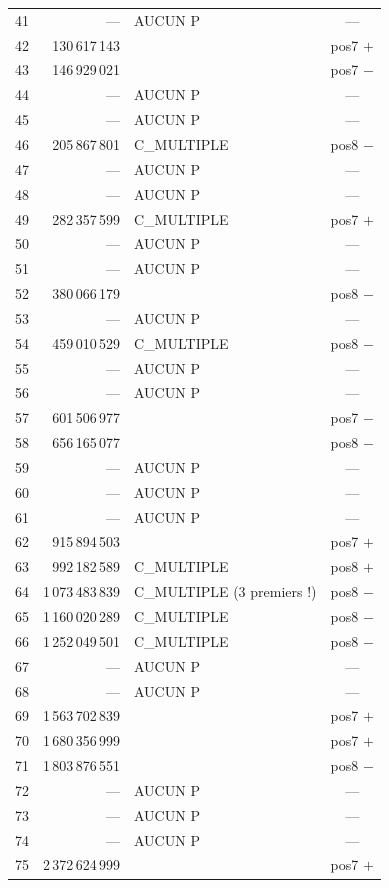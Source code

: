 \documentclass[11pt,a4paper]{article}
\begin{document}
{\begin{longtable}{@{}c r l c@{}}
41 & --- & AUCUN P & --- \\
42 & 130\,617\,143 & & pos7 $+$ \\
43 & 146\,929\,021 & & pos7 $-$ \\
44 & --- & AUCUN P & --- \\
45 & --- & AUCUN P & --- \\
46 & 205\,867\,801 & C\_MULTIPLE & pos8 $-$ \\
47 & --- & AUCUN P & --- \\
48 & --- & AUCUN P & --- \\
49 & 282\,357\,599 & C\_MULTIPLE & pos7 $+$ \\
50 & --- & AUCUN P & --- \\
51 & --- & AUCUN P & --- \\
52 & 380\,066\,179 & & pos8 $-$ \\
53 & --- & AUCUN P & --- \\
54 & 459\,010\,529 & C\_MULTIPLE & pos8 $-$ \\
55 & --- & AUCUN P & --- \\
56 & --- & AUCUN P & --- \\
57 & 601\,506\,977 & & pos7 $-$ \\
58 & 656\,165\,077 & & pos8 $-$ \\
59 & --- & AUCUN P & --- \\
60 & --- & AUCUN P & --- \\
61 & --- & AUCUN P & --- \\
62 & 915\,894\,503 & & pos7 $+$ \\
63 & 992\,182\,589 & C\_MULTIPLE & pos8 $+$ \\
64 & 1\,073\,483\,839 & C\_MULTIPLE (3 premiers !) & pos8 $-$ \\
65 & 1\,160\,020\,289 & C\_MULTIPLE & pos8 $-$ \\
66 & 1\,252\,049\,501 & C\_MULTIPLE & pos8 $-$ \\
67 & --- & AUCUN P & --- \\
68 & --- & AUCUN P & --- \\
69 & 1\,563\,702\,839 & & pos7 $+$ \\
70 & 1\,680\,356\,999 & & pos7 $+$ \\
71 & 1\,803\,876\,551 & & pos8 $-$ \\
72 & --- & AUCUN P & --- \\
73 & --- & AUCUN P & --- \\
74 & --- & AUCUN P & --- \\
75 & 2\,372\,624\,999 & & pos7 $+$ \\

\end{longtable}}
\end{document}
